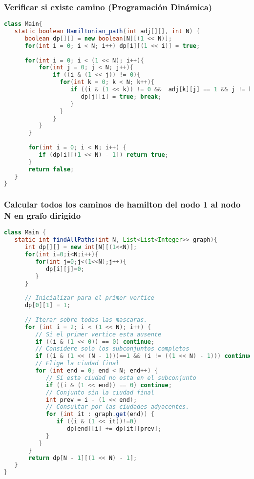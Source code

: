 \subsubsection{Verificar si existe camino (Programación Dinámica)}
\begin{lstlisting}[language=Java]
class Main{
   static boolean Hamiltonian_path(int adj[][], int N) {
      boolean dp[][] = new boolean[N][(1 << N)];
      for(int i = 0; i < N; i++) dp[i][(1 << i)] = true;
      
      for(int i = 0; i < (1 << N); i++){
          for(int j = 0; j < N; j++){
              if ((i & (1 << j)) != 0){
              	for(int k = 0; k < N; k++){
                   if ((i & (1 << k)) != 0 &&  adj[k][j] == 1 && j != k && dp[k][i ^ (1 << j)]) {
                      dp[j][i] = true; break;
                   }
                }
              }
          }
       }
			
       for(int i = 0; i < N; i++) {
          if (dp[i][(1 << N) - 1]) return true;
       }
	   return false;
   }
}
\end{lstlisting}

\subsubsection{Calcular todos los caminos de hamilton del nodo 1 al nodo N en grafo dirigido}
\begin{lstlisting}[language=Java]
class Main {
   static int findAllPaths(int N, List<List<Integer>> graph){
      int dp[][] = new int[N][(1<<N)];
      for(int i=0;i<N;i++){
         for(int j=0;j<(1<<N);j++){
            dp[i][j]=0;
         }
      }
		
      // Inicializar para el primer vertice
      dp[0][1] = 1;
      
      // Iterar sobre todas las mascaras.
      for (int i = 2; i < (1 << N); i++) {
         // Si el primer vertice esta ausente
         if ((i & (1 << 0)) == 0) continue;
         // Considere solo los subconjuntos completos
         if ((i & (1 << (N - 1)))==1 && (i != ((1 << N) - 1))) continue;
         // Elige la ciudad final
         for (int end = 0; end < N; end++) {
            // Si esta ciudad no esta en el subconjunto
            if ((i & (1 << end)) == 0) continue;
            // Conjunto sin la ciudad final
            int prev = i - (1 << end);
            // Consultar por las ciudades adyacentes.
            for (int it : graph.get(end)) {
               if ((i & (1 << it))!=0)
                  dp[end][i] += dp[it][prev];
            }
          }
       }
       return dp[N - 1][(1 << N) - 1];
   }
}
\end{lstlisting}